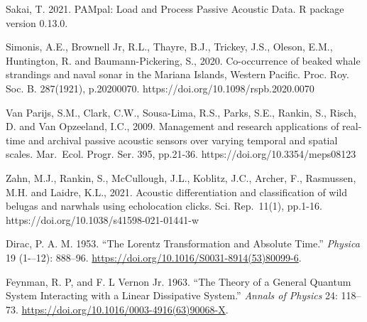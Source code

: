 \documentclass[
  letterpaper,
  DIV=11,
  numbers=noendperiod]{scrartcl}
\newlength{\cslhangindent}
\newlength{\cslentryspacingunit} %
\newenvironment{CSLReferences}[2] %
 {%
  \setlength{\parindent}{0pt}
  \ifodd #1
  \let\oldpar\par
  \def\par{\hangindent=\cslhangindent\oldpar}
  \fi
  \setlength{\parskip}{#2\cslentryspacingunit}
 }%
 {}
\begin{document}
Sakai, T. 2021. PAMpal: Load and Process Passive Acoustic Data. R
package version 0.13.0.

Simonis, A.E., Brownell Jr, R.L., Thayre, B.J., Trickey, J.S., Oleson,
E.M., Huntington, R. and Baumann-Pickering, S., 2020. Co-occurrence of
beaked whale strandings and naval sonar in the Mariana Islands, Western
Pacific. Proc. Roy. Soc. B. 287(1921), p.20200070.
https://doi.org/10.1098/rspb.2020.0070

Van Parijs, S.M., Clark, C.W., Sousa-Lima, R.S., Parks, S.E., Rankin,
S., Risch, D. and Van Opzeeland, I.C., 2009. Management and research
applications of real-time and archival passive acoustic sensors over
varying temporal and spatial scales. Mar.~Ecol. Progr. Ser. 395,
pp.21-36. https://doi.org/10.3354/meps08123

Zahn, M.J., Rankin, S., McCullough, J.L., Koblitz, J.C., Archer, F.,
Rasmussen, M.H. and Laidre, K.L., 2021. Acoustic differentiation and
classification of wild belugas and narwhals using echolocation clicks.
Sci. Rep.~11(1), pp.1-16. https://doi.org/10.1038/s41598-021-01441-w

\hypertarget{refs}{}
\begin{CSLReferences}{1}{0}
\leavevmode{}%
Dirac, P. A. M. 1953. {``The {Lorentz} Transformation and Absolute
Time.''} \emph{Physica} 19 (1-\/--12): 888--96.
\url{https://doi.org/10.1016/S0031-8914(53)80099-6}.

\leavevmode{}%
Feynman, R. P, and F. L Vernon Jr. 1963. {``The Theory of a General
Quantum System Interacting with a Linear Dissipative System.''}
\emph{Annals of Physics} 24: 118--73.
\url{https://doi.org/10.1016/0003-4916(63)90068-X}.

\end{CSLReferences}
\end{document}
